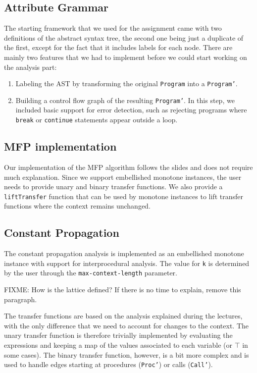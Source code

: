 \documentclass{article}
\begin{document}
\subsection*{Attribute Grammar}

The starting framework that we used for the assignment came with two definitions of the abstract syntax tree, the second one being just a duplicate of the first, except for the fact that it includes labels for each node. There are mainly two features that we had to implement before we could start working on the analysis part:

\begin{enumerate}
	\item Labeling the AST by transforming the original \texttt{Program} into a \texttt{Program'}.
	\item Building a control flow graph of the resulting \texttt{Program'}. In this step, we included basic support for error detection, such as rejecting programs where \texttt{break} or \texttt{continue} statements appear outside a loop.
\end{enumerate}

\subsection*{MFP implementation}

Our implementation of the MFP algorithm follows the slides and does not require much explanation. Since we support embellished monotone instances, the user needs to provide unary and binary transfer functions. We also provide a \texttt{liftTransfer} function that can be used by monotone instances to lift transfer functions where the context remains unchanged.

\subsection*{Constant Propagation}

The constant propagation analysis is implemented as an embellished monotone instance with support for interprocedural analysis. The value for \texttt{k} is determined by the user through the \texttt{max-context-length} parameter.

FIXME: How is the lattice defined? If there is no time to explain, remove this paragraph.

The transfer functions are based on the analysis explained during the lectures, with the only difference that we need to account for changes to the context. The unary transfer function is therefore trivially implemented by evaluating the expressions and keeping a map of the values associated to each variable (or $\top$ in some cases). The binary transfer function, however, is a bit more complex and is used to handle edges starting at procedures (\texttt{Proc'}) or calls (\texttt{Call'}).
\end{document}
